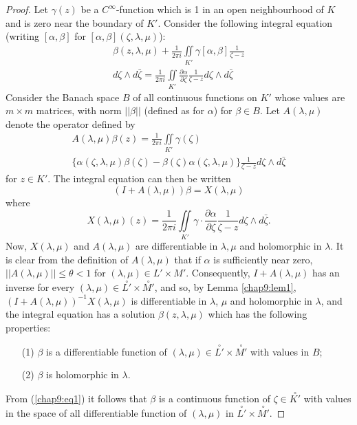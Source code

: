 \begin{proof}
Let $\gamma(z)$ be a $C^\infty$-function which is 1 in an open
neighbourhood of $K$ and is zero near the boundary of $K'$. Consider
the following integral equation (writing $[\alpha, \beta]$ for
$[\alpha, \beta] (\zeta, \lambda, \mu)$):
\begin{multline*}
\beta (z, \lambda, \mu) + \frac{1}{2\pi i} \iint\limits_{K'} \gamma
      [\alpha, \beta] \frac{1}{\zeta-z}\\ d \zeta \wedge d\bar{\zeta} =
      \frac{1}{2\pi i} \iint\limits_{K'}  \frac{\partial
        \alpha}{\partial \zeta} \frac{1}{\zeta -z}  d \zeta \wedge d
      \bar{\zeta} 
\end{multline*}
Consider the Banach space $B$ of all continuous functions on $K'$
whose values are $m \times m$ matrices, with norm $||\beta||$ (defined
as for $\alpha$) for $\beta \in B$. Let $A(\lambda, \mu)$ denote the
operator defined by
\begin{multline*}
A (\lambda, \mu) \beta (z) = \frac{1}{2 \pi i} \iint\limits_{K'}
\gamma (\zeta) \\
\{\alpha (\zeta, \lambda, \mu) \beta (\zeta) - \beta(\zeta) \alpha
(\zeta, \lambda, \mu)\} \frac{1}{\zeta-z} d \zeta \wedge d \bar{\zeta}
\end{multline*}
for $z \in K'$. The integral equation can then be written 
$$
(I + A (\lambda, \mu)) \beta = X (\lambda, \mu)
$$\pageoriginale
where 
$$
X(\lambda, \mu) (z) = \frac{1}{2\pi i} \iint\limits_{K'} \gamma \cdot
\frac{\partial \alpha}{\partial \zeta}  \frac{1}{\zeta -z} d \zeta
\wedge d \bar{\zeta}.
$$
Now, $X(\lambda, \mu)$ and $A(\lambda, \mu)$ are differentiable in
$\lambda, \mu$ and holomorphic in $\lambda$. It is clear from the
definition of $A(\lambda, \mu)$ that if $\alpha$ is sufficiently near
zero, $||A(\lambda ,\mu)|| \leq \theta < 1$ for $(\lambda, \mu) \in L'
\times M'$. Consequently, $I + A(\lambda, \mu)$ has an inverse for
every $(\lambda, \mu) \in \overset{\circ}{L'} \times
\overset{\circ}{M'}$, and so, by Lemma \ref{chap9:lem1}, $(I + A(\lambda, \mu))^{-1}
X (\lambda, \mu)$ is differentiable in $\lambda$, $\mu$ and
holomorphic in $\lambda$, and the integral equation has a solution
$\beta(z, \lambda, \mu)$ which has the following properties:
\begin{itemize}
\item[(1)] $\beta$ is a differentiable function of $(\lambda, \mu) \in
  \overset{\circ}{L'} \times \overset{\circ}{M'}$ with values in $B$; 

\item[(2)] $\beta$ is holomorphic in $\lambda$. 
\end{itemize}
From (\ref{chap9:eq1}) it follows that $\beta$ is a continuous function of $\zeta
\in \overset{\circ}{K'}$ with values in the space of all
differentiable function of $(\lambda, \mu)$ in $\overset{\circ}{L'}
\times \overset{\circ}{M'}$. 


\end{proof}
